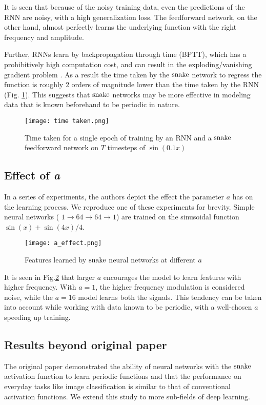 It is seen that because of the noisy training data, even the predictions of the RNN are noisy, with a high generalization loss. The feedforward network, on the other hand, almost perfectly learns the underlying function with the right frequency and amplitude.

Further, RNNs learn by backpropagation through time (BPTT), which has a prohibitively high computation cost, and can result in the exploding/vanishing gradient problem \cite{pascanu2013difficulty}. As a result the time taken by the $ \operatorname{snake} $ network to regress the function is roughly 2 orders of magnitude lower than the time taken by the RNN (Fig. \ref{fig:rnn_time}). This suggests that $ \operatorname{snake} $ networks may be more effective in modeling data that is known beforehand to be periodic in nature.

\begin{figure}[h]
\centering
\texttt{[image: time taken.png]}
\caption{Time taken for a single epoch of training by an RNN and a $ \operatorname{snake} $ feedforward network on $T$ timesteps of $\sin(0.1x)$}
\label{fig:rnn_time}
\end{figure}

\subsection{Effect of \textbf{\textit{a}}}
In a series of experiments, the authors depict the effect the parameter $a$ has on the learning process. We reproduce one of these experiments for brevity. Simple neural networks ( $ 1 \rightarrow 64 \rightarrow 64 \rightarrow 1 $) are trained on the sinusoidal function $\sin(x) + \sin(4x)/4$.

\begin{figure}[h]
\centering
\texttt{[image: a\_effect.png]}
\caption{Features learned by $ \operatorname{snake} $ neural networks at different $a$}
\label{fig:a_effect}
\end{figure}

It is seen in Fig.\ref{fig:a_effect} that larger $a$ encourages the model to learn features with higher frequency. With $a = 1$, the higher frequency modulation is considered noise, while the $a = 16$ model learns both the signals. This tendency can be taken into account while working with data known to be periodic, with a well-chosen $a$ speeding up training.

\subsection{Results beyond original paper}
The original paper demonstrated the ability of neural networks with the $ \operatorname{snake} $ activation function to learn periodic functions and that the performance on everyday tasks like image classification is similar to that of conventional activation functions. We extend this study to more sub-fields of deep learning. \\

